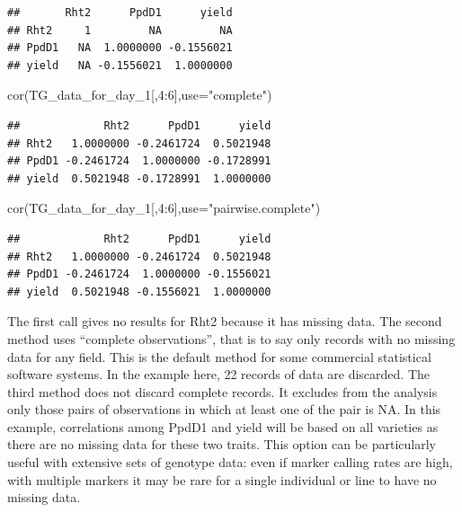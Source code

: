 \documentclass[
]{book}
\newenvironment{Shaded}{\begin{snugshade}}{\end{snugshade}}
\newcommand{\AttributeTok}[1]{\textcolor[rgb]{0.77,0.63,0.00}{#1}}
\newcommand{\DecValTok}[1]{\textcolor[rgb]{0.00,0.00,0.81}{#1}}
\newcommand{\FunctionTok}[1]{\textcolor[rgb]{0.00,0.00,0.00}{#1}}
\newcommand{\NormalTok}[1]{#1}
\newcommand{\SpecialCharTok}[1]{\textcolor[rgb]{0.00,0.00,0.00}{#1}}
\newcommand{\StringTok}[1]{\textcolor[rgb]{0.31,0.60,0.02}{#1}}
\begin{document}
\begin{verbatim}
##       Rht2      PpdD1      yield
## Rht2     1         NA         NA
## PpdD1   NA  1.0000000 -0.1556021
## yield   NA -0.1556021  1.0000000
\end{verbatim}

\begin{Shaded}
\begin{Highlighting}[]
\FunctionTok{cor}\NormalTok{(TG\_data\_for\_day\_1[,}\DecValTok{4}\SpecialCharTok{:}\DecValTok{6}\NormalTok{],}\AttributeTok{use=}\StringTok{"complete"}\NormalTok{)}
\end{Highlighting}
\end{Shaded}

\begin{verbatim}
##             Rht2      PpdD1      yield
## Rht2   1.0000000 -0.2461724  0.5021948
## PpdD1 -0.2461724  1.0000000 -0.1728991
## yield  0.5021948 -0.1728991  1.0000000
\end{verbatim}

\begin{Shaded}
\begin{Highlighting}[]
\FunctionTok{cor}\NormalTok{(TG\_data\_for\_day\_1[,}\DecValTok{4}\SpecialCharTok{:}\DecValTok{6}\NormalTok{],}\AttributeTok{use=}\StringTok{"pairwise.complete"}\NormalTok{)}
\end{Highlighting}
\end{Shaded}

\begin{verbatim}
##             Rht2      PpdD1      yield
## Rht2   1.0000000 -0.2461724  0.5021948
## PpdD1 -0.2461724  1.0000000 -0.1556021
## yield  0.5021948 -0.1556021  1.0000000
\end{verbatim}

The first call gives no results for Rht2 because it has missing data. The second method uses ``complete observations'', that is to say only records with no missing data for any field. This is the default method for some commercial statistical software systems. In the example here, 22 records of data are discarded. The third method does not discard complete records. It excludes from the analysis only those pairs of observations in which at least one of the pair is NA. In this example, correlations among PpdD1 and yield will be based on all varieties as there are no missing data for these two traits. This option can be particularly useful with extensive sets of genotype data: even if marker calling rates are high, with multiple markers it may be rare for a single individual or line to have no missing data.
\end{document}
